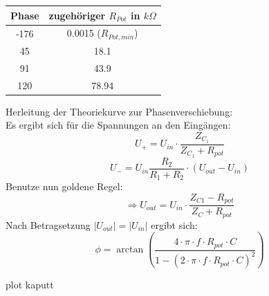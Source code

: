 \documentclass[compress,11pt]{beamer}
\begin{document}
\begin{frame}
\begin{tabular}{|c|c|}
\hline
Phase & zugehöriger $R_{Pot}$ in $k \Omega$  \\
\hline
    -176 & 0.0015 ($R_{Pot,min}$) \\
    45 & 18.1 \\
    91 & 43.9 \\
	120 & 78.94 \\
	
	
\hline
\end{tabular}

\end{frame}
\begin{frame}
Herleitung der Theoriekurve zur Phasenverschiebung:\\
Es ergibt sich für die Spannungen an den Eingängen:
\begin{equation}
U_{+} = U_{in} \cdot \frac{Z_{C_1}}{Z_{C_1} + R_{pot}}
\end{equation}
\begin{equation}
U_{-} = U_{in} \frac{R_2}{R_1 + R_2} \cdot (U_{out} - U_{in})
\end{equation}
Benutze nun goldene Regel:
\begin{equation}
\Rightarrow U_{out} = U_{in} \cdot \frac{Z_{C1} - R_{pot}}{Z_{C} + R_{pot}}
\end{equation}
Nach Betragsetzung $|U_{out}| = |U_{in}|$ ergibt sich:
\begin{equation}
\phi = \arctan (\frac{4 \cdot \pi \cdot f \cdot R_{pot} \cdot C }{1 - (2 \cdot \pi \cdot f \cdot R_{pot} \cdot C)^2})
\end{equation}
\end{frame}
\begin{frame}
plot kaputt
\end{frame}
\end{document}
